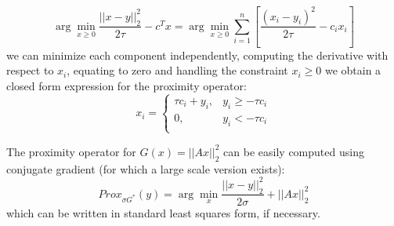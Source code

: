 \documentclass[12pt,draftcls, onecolumn, letterpaper,compsoc]{IEEEtran}
\begin{document}
\begin{displaymath}
    \arg\min_{x\geq 0} \frac{||x-y||_{2}^{2}}{2\tau} -c^Tx = \arg\min_{x\geq 0} \sum_{i=1}^{n}\left[\frac{(x_i - y_i)^{2}}{2\tau}-c_ix_i\right]
\end{displaymath}
we can minimize each component independently, computing the derivative with respect to $x_i$, equating to zero and handling the constraint $x_i \geq 0$ we obtain a closed form expression for the proximity operator:
\begin{displaymath}
    x_i =
    \left\lbrace\begin{array}{ll}
        \tau c_i + y_i, & y_i \geq - \tau c_i \\
        0, & y_i < -\tau c_i \\
    \end{array}\right.
\end{displaymath}

The proximity operator for $G(x) = ||Ax||_{2}^{2}$ can be easily computed using conjugate gradient (for which a large scale version exists):
\begin{displaymath}
    Prox_{\sigma G^{*}}(y) = \arg\min_{x} \frac{||x-y||_{2}^{2}}{2\sigma} + ||Ax||_{2}^{2}
\end{displaymath}
which can be written in standard least squares form, if necessary.
\end{document}
